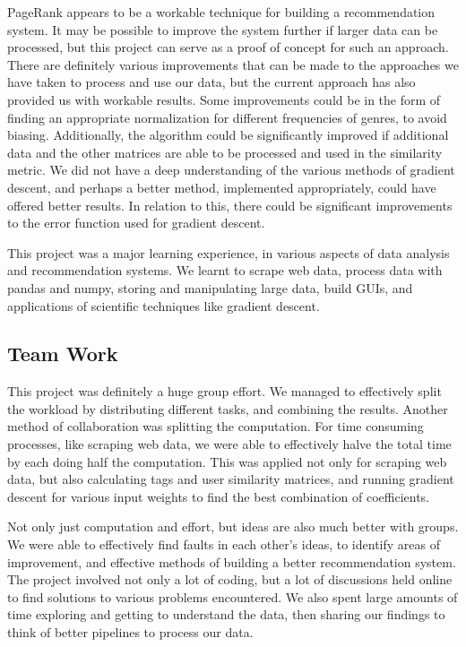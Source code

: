 \documentclass[11pt]{article}
\begin{document}
PageRank appears to be a workable technique for building a
recommendation system. It may be possible to improve the system further
if larger data can be processed, but this project can serve as a proof
of concept for such an approach. There are definitely various
improvements that can be made to the approaches we have taken to process
and use our data, but the current approach has also provided us with
workable results. Some improvements could be in the form of finding an
appropriate normalization for different frequencies of genres, to avoid
biasing. Additionally, the algorithm could be significantly improved if
additional data and the other matrices are able to be processed and used
in the similarity metric. We did not have a deep understanding of the
various methods of gradient descent, and perhaps a better method,
implemented appropriately, could have offered better results. In
relation to this, there could be significant improvements to the error
function used for gradient descent.

This project was a major learning experience, in various aspects of data
analysis and recommendation systems. We learnt to scrape web data,
process data with pandas and numpy, storing and manipulating large data,
build GUIs, and applications of scientific techniques like gradient
descent.

\hypertarget{team-work}{%
\subsection{Team Work}\label{team-work}}

This project was definitely a huge group effort. We managed to
effectively split the workload by distributing different tasks, and
combining the results. Another method of collaboration was splitting the
computation. For time consuming processes, like scraping web data, we
were able to effectively halve the total time by each doing half the
computation. This was applied not only for scraping web data, but also
calculating tags and user similarity matrices, and running gradient
descent for various input weights to find the best combination of
coefficients.

Not only just computation and effort, but ideas are also much better
with groups. We were able to effectively find faults in each other's
ideas, to identify areas of improvement, and effective methods of
building a better recommendation system. The project involved not only a
lot of coding, but a lot of discussions held online to find solutions to
various problems encountered. We also spent large amounts of time
exploring and getting to understand the data, then sharing our findings
to think of better pipelines to process our data.


    
    
    
\end{document}
